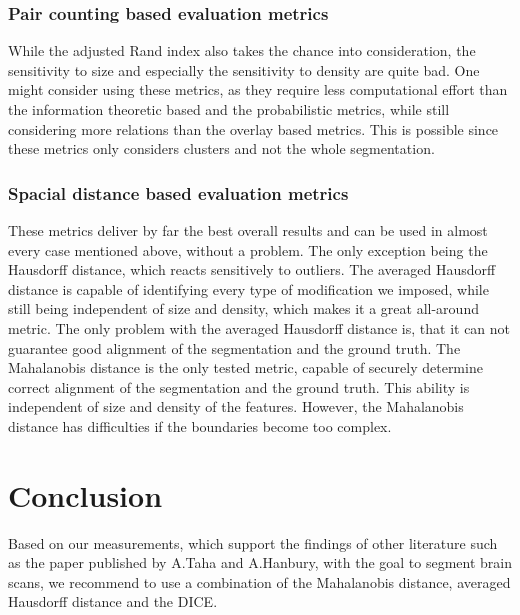 \documentclass[journal]{IEEEtran}
\begin{document}
{\subsubsection{Pair counting based evaluation metrics}
While the adjusted Rand index also takes the chance into consideration, the sensitivity to size and especially the sensitivity to density are quite bad. One might consider using these metrics, as they require less computational effort than the information theoretic based and the probabilistic metrics, while still considering more relations than the overlay based metrics. This is possible since these metrics only considers clusters and not the whole segmentation.

\subsubsection{Spacial distance based evaluation metrics}
These metrics deliver by far the best overall results and can be used in almost every case mentioned above, without a problem. The only exception being the Hausdorff distance, which reacts sensitively to outliers. The averaged Hausdorff distance is capable of identifying every type of modification we imposed, while still being independent of size and density, which makes it a great all-around metric. The only problem with the averaged Hausdorff distance is, that it can not guarantee good alignment of the segmentation and the ground truth. The Mahalanobis distance is the only tested metric, capable of securely determine correct alignment of the segmentation and the ground truth. This ability is independent of size and density of the features. However, the Mahalanobis distance has difficulties if the boundaries become too complex.

} %






\section{Conclusion}
\label{Conclusion}

Based on our measurements, which support the findings of other literature such as the paper published by A.Taha and A.Hanbury, with the goal to segment brain scans, we recommend to use a combination of the Mahalanobis distance, averaged Hausdorff distance and the DICE.

\hspace{2in}
\end{document}
